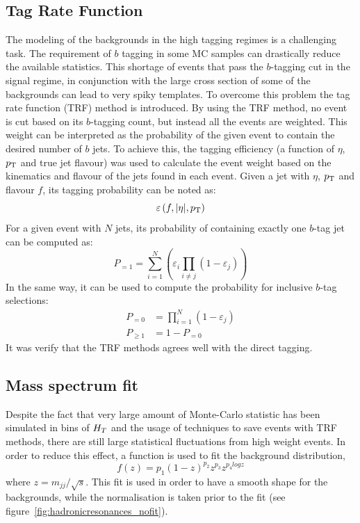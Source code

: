 \subsection{Tag Rate Function}
\label{subsec:trf}
The modeling of the backgrounds in the high tagging regimes is a challenging task. 
The requirement of $b$ tagging in some MC samples can drastically reduce the available statistics.
This shortage of events that pass the $b$-tagging cut in the signal regime, in conjunction with the large cross section of some of the backgrounds can lead to very spiky templates. 
\newline
To overcome this problem the tag rate function (TRF) method is introduced. 
By using the TRF method, no event is cut based on its $b$-tagging count, but instead all the events are weighted.
This weight can be interpreted as the probability of the given event to contain the desired number of $b$ jets. 
To achieve this, the tagging efficiency (a function of $\eta$, $p_{\text{T}}$ and true jet flavour) was
used to calculate the event weight based on the kinematics and flavour of the jets found in each event.
\newline
Given a jet with $\eta$, $p_{\text{T}}$ and flavour $f$, its tagging probability can be noted as:
\begin{equation*}
	\varepsilon \left(f,|\eta|,p_{\text{T}}\right)
\end{equation*}
\newline
For a given event with $N$ jets, its probability of containing exactly one $b$-tag jet can be computed as:
\begin{equation*}
	P_{=1} = \sum\limits_{i=1}^N \left( \varepsilon_{i} \prod\limits_{i \neq j} \left( 1 - \varepsilon_{j} \right) \right)
\end{equation*}
\newline
In the same way, it can be used to compute the probability for inclusive $b$-tag selections:
\begin{align*}
	P_{=0} &= \prod\limits_{i=1}^N \left( 1 - \varepsilon_{j} \right) \\
	P_{\geq 1} &= 1 - P_{=0}
\end{align*}
\newline
It was verify that the TRF methods agrees well with the direct tagging.

\subsection{Mass spectrum fit}
Despite the fact that very large amount of Monte-Carlo statistic has been simulated in bins of $H_{T}$
and the usage of techniques to save events with TRF methods,
there are still large statistical fluctuations from high weight events.
In order to reduce this effect, a function is used to fit the background distribution,
\begin{equation}
f(z)=p_1(1-z)^{p_2}z^{p_3}z^{p_{4}logz}
\end{equation}
where $z=m_{jj}/\sqrt{s}$. This fit is used in order to have a smooth shape for the backgrounds, while the normalisation is taken prior to the fit (see figure~\ref{fig:hadronicresonances_nofit}).

